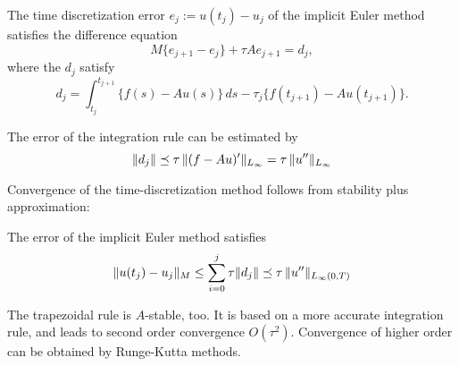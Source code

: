 \begin{lemma} The time discretization error $e_j := u(t_j) - u_j$ of the
implicit Euler method satisfies the difference equation
$$
M \{ e_{j+1} - e_j \} + \tau A e_{j+1} = d_j,
$$
where the $d_j$ satisfy
$$
d_j = \int_{t_j}^{t_{j+1}} \{ f(s) - A u(s) \} \, ds - \tau_j \{ f(t_{j+1}) - A u(t_{j+1}) \}.
$$
\end{lemma}

\begin{lemma} The  error of the integration rule can be estimated by
$$
\| d_j \| \preceq \tau \, \| (f - A u)^\prime \|_{L_\infty} = \tau \, \| u^{\prime \prime} \|_{L_\infty}
$$
\end{lemma}

Convergence of the time-discretization method follows from stability plus 
approximation:
\begin{theorem} The error of the implicit Euler method satisfies
$$
\| u(t_j) - u_j \|_M \leq \sum_{i=0}^j \tau \| d_j \| \preceq \tau \, \| u^{\prime \prime} \|_{L_\infty(0,T)}
$$
\end{theorem}

\bigskip
The trapezoidal rule is $A$-stable, too. It is based on a more accurate integration
rule, and leads to second order convergence $O(\tau^2)$.
Convergence of higher order can be obtained by Runge-Kutta methods. 




